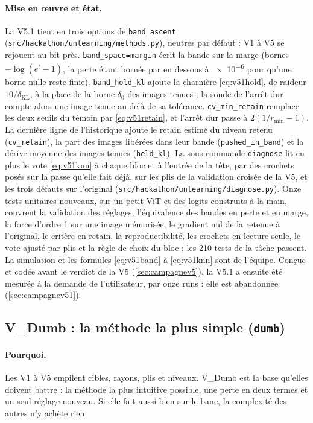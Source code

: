 \documentclass[11pt,a4paper]{article}
\newcommand{\KL}{\operatorname{KL}}
\newcommand{\code}[1]{\texttt{#1}}
\newcommand{\chemin}[1]{\nolinkurl{#1}}%
\begin{document}
\paragraph{Mise en œuvre et état.} La V5.1 tient en trois options de \code{band\_ascent}
(\chemin{src/hackathon/unlearning/methods.py}), neutres par défaut : V1 à V5 se rejouent au bit près.
\code{band\_space=margin} écrit la bande sur la marge (bornes $-\log(e^{t}-1)$, la perte étant
bornée par en dessous à \num{e-6} pour qu'une borne nulle reste finie). \code{band\_hold\_kl} ajoute la
charnière \eqref{eq:v51hold}, de raideur $10/\delta_{\KL}$, à la place de la borne $\delta_0$ des
images tenues ; la sonde de l'arrêt dur compte alors une image tenue au-delà de sa tolérance.
\code{cv\_min\_retain} remplace les deux seuils du témoin par \eqref{eq:v51retain}, et l'arrêt dur
passe à $2(1/r_{\min}-1)$. La dernière ligne de l'historique ajoute le retain estimé du niveau
retenu (\code{cv\_retain}), la part des images libérées dans leur bande (\code{pushed\_in\_band})
et la dérive moyenne des images tenues (\code{held\_kl}). La sous-commande \code{diagnose} lit en
plus le vote \eqref{eq:v51knn} à chaque bloc et à l'entrée de la tête, par des crochets posés sur la
passe qu'elle fait déjà, sur les plis de la validation croisée de la V5, et les trois défauts sur
l'original (\chemin{src/hackathon/unlearning/diagnose.py}). Onze tests unitaires nouveaux, sur un
petit ViT et des logits construits à la main, couvrent la validation des réglages, l'équivalence des
bandes en perte et en marge, la force d'ordre 1 sur une image mémorisée, le gradient nul de la
retenue à l'original, le critère en retain, la reproductibilité, les crochets en lecture seule, le
vote ajusté par plis et la règle de choix du bloc ; les 210 tests de la tâche passent. La simulation
et les formules \eqref{eq:v51band} à \eqref{eq:v51knn} sont de l'équipe. Conçue et codée avant le
verdict de la V5 (\cref{sec:campagnev5}), la V5.1 a ensuite été mesurée à la demande de
l'utilisateur, par onze runs : elle est abandonnée (\cref{sec:campagnev51}).

\subsection{V\_Dumb : la méthode la plus simple (\code{dumb})}\label{sec:vdumb}
\paragraph{Pourquoi.} Les V1 à V5 empilent cibles, rayons, plis et niveaux. V\_Dumb est la base
qu'elles doivent battre : la méthode la plus intuitive possible, une perte en deux termes et un seul
réglage nouveau. Si elle fait aussi bien sur le banc, la complexité des autres n'y achète rien.
\end{document}
